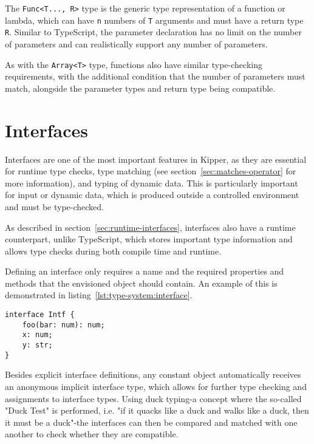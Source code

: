 The \lstinline|Func<T..., R>| type is the generic type representation of a function or lambda, which can have \lstinline|n| numbers of \lstinline|T| arguments and must have a return type \lstinline|R|. Similar to TypeScript, the parameter declaration has no limit on the number of parameters and can realistically support any number of parameters.

As with the \lstinline|Array<T>| type, functions also have similar type-checking requirements, with the additional condition that the number of parameters must match, alongside the parameter types and return type being compatible.

\section{Interfaces}
\label{sec:kipper-interfaces}

Interfaces are one of the most important features in Kipper, as they are essential for runtime type checks, type matching (see section~\ref{sec:matches-operator} for more information), and typing of dynamic data. This is particularly important for input or dynamic data, which is produced outside a controlled environment and must be type-checked.

As described in section~\ref{sec:runtime-interfaces}, interfaces also have a runtime counterpart, unlike TypeScript, which stores important type information and allows type checks during both compile time and runtime.

Defining an interface only requires a name and the required properties and methods that the envisioned object should contain. An example of this is demonstrated in listing~\ref{lst:type-system:interface}.

\begin{lstlisting}[language=Kipper,caption=The definition of a simple interface with a method and properties,label=lst:type-system:interface]
interface Intf {
	foo(bar: num): num;
	x: num;
	y: str;
}
\end{lstlisting}

Besides explicit interface definitions, any constant object automatically receives an anonymous implicit interface type, which allows for further type checking and assignments to interface types. Using duck typing-a concept where the so-called "Duck Test" is performed, i.e. "if it quacks like a duck and walks like a duck, then it must be a duck"-the interfaces can then be compared and matched with one another to check whether they are compatible.

